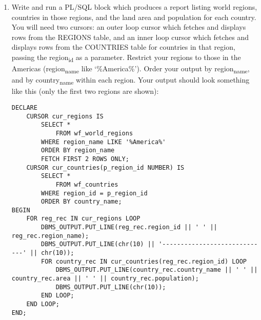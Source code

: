 \documentclass[11pt]{article}
\begin{document}
\begin{enumerate}
\item Write and run a PL/SQL block which produces a report listing world regions, countries in those regions, and the land area and population for each country. You will need two cursors: an outer loop cursor which fetches and displays rows from the REGIONS table, and an inner loop cursor which fetches and displays rows from the COUNTRIES table for countries in that region, passing the region\textsubscript{id} as a parameter. Restrict your regions to those in the Americas (region\textsubscript{name} like ‘\%America\%’). Order your output by region\textsubscript{name}, and by country\textsubscript{name} within each region. Your output should look something like this (only the first two regions are shown):
\begin{verbatim}
DECLARE
    CURSOR cur_regions IS
        SELECT *
            FROM wf_world_regions
        WHERE region_name LIKE '%America%'
        ORDER BY region_name
        FETCH FIRST 2 ROWS ONLY;
    CURSOR cur_countries(p_region_id NUMBER) IS
        SELECT *
            FROM wf_countries
        WHERE region_id = p_region_id
        ORDER BY country_name;
BEGIN
    FOR reg_rec IN cur_regions LOOP
        DBMS_OUTPUT.PUT_LINE(reg_rec.region_id || ' ' || reg_rec.region_name);
        DBMS_OUTPUT.PUT_LINE(chr(10) || '-----------------------------' || chr(10));
        FOR country_rec IN cur_countries(reg_rec.region_id) LOOP
            DBMS_OUTPUT.PUT_LINE(country_rec.country_name || ' ' || country_rec.area || ' ' || country_rec.population);
            DBMS_OUTPUT.PUT_LINE(chr(10));
        END LOOP;
    END LOOP;
END;
\end{verbatim}


\end{enumerate}
\end{document}
